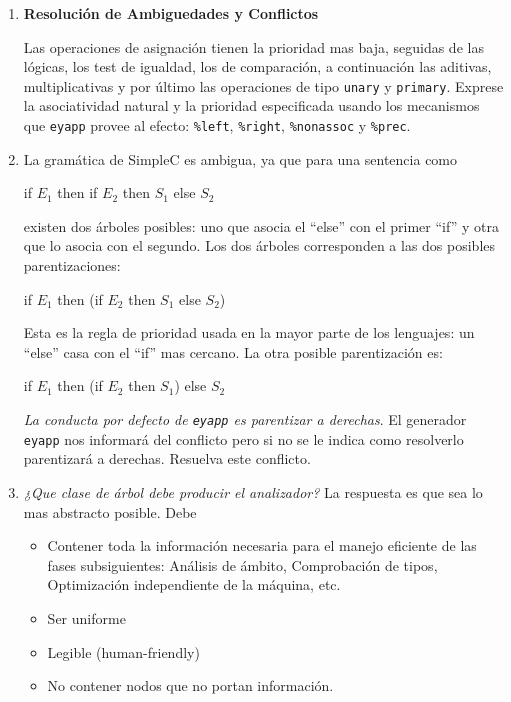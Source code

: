 \begin{enumerate}
\item {\bf Resolución de Ambiguedades y Conflictos}

Las operaciones de asignación tienen la prioridad mas baja,
seguidas  de las lógicas, los test de igualdad,
los de comparación, a continuación las aditivas, multiplicativas y por 
último las operaciones de tipo \verb|unary| y \verb|primary|.
Exprese la asociatividad natural y la
prioridad especificada usando
los mecanismos que \verb|eyapp| provee al efecto: \verb|%left|, \verb|%right|,
\verb|%nonassoc| y \verb|%prec|.

\item
La gramática de SimpleC es ambigua, ya que para una sentencia como 

\begin{center}
if $E_1$ then if $E_2$ then $S_1$ else $S_2$
\end{center}

existen dos árboles posibles: uno que asocia el ``else'' con el primer ``if'' y otra
que lo asocia con el segundo. Los dos árboles corresponden a las
dos posibles parentizaciones:

\begin{center}
if $E_1$ then (if $E_2$ then $S_1$ else $S_2$)
\end{center}

Esta es la regla de prioridad usada en la mayor parte de los lenguajes:
un ``else'' casa con el ``if'' mas cercano. La otra posible parentización
es:

\begin{center}
if $E_1$ then (if $E_2$ then $S_1$) else $S_2$
\end{center}

\emph{La conducta por defecto de {\tt eyapp} es parentizar a derechas}.
El generador  {\tt eyapp}  nos informará del conflicto pero si no se le indica 
como resolverlo parentizará a derechas.
Resuelva este conflicto.

\item {\it ¿Que clase de árbol debe producir el analizador?}
La respuesta es que sea lo mas abstracto posible.
Debe 
\begin{itemize}
\item
Contener toda la información necesaria para el manejo eficiente
de las fases subsiguientes: Análisis de ámbito, Comprobación de tipos,
Optimización independiente de la máquina, etc.
\item 
Ser uniforme
\item
Legible (human-friendly)
\item
No contener nodos que no portan información. 
\end{itemize}


\end{enumerate}

